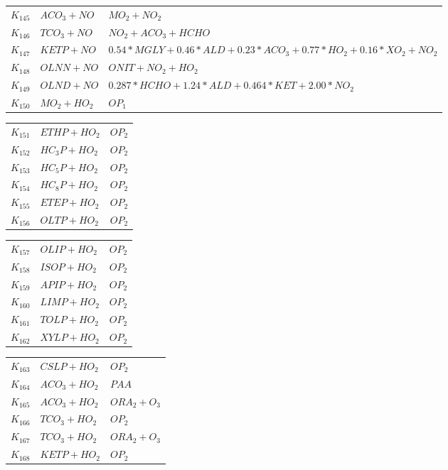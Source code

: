 {\begin{tabular}{l@{\,:\,}p{0.2\chfwidth}@{$\quad\longrightarrow\quad$}p{0.6\chfwidth}}
$K_{145}$ & $ACO_{3}+NO$ & $MO_{2}+NO_{2}$ \\
$K_{146}$ & $TCO_{3}+NO$ & $NO_{2}+ACO_{3}+HCHO$ \\
$K_{147}$ & $KETP+NO$ & $0.54*MGLY+0.46*ALD+0.23*ACO_{3}+0.77*HO_{2}+0.16*XO_{2}+NO_{2}$ \\
$K_{148}$ & $OLNN+NO$ & $ONIT+NO_{2}+HO_{2}$ \\
$K_{149}$ & $OLND+NO$ & $0.287*HCHO+1.24*ALD+0.464*KET+2.00*NO_{2}$ \\
$K_{150}$ & $MO_{2}+HO_{2}$ & $OP_{1}$ \\
\end{tabular}

\begin{tabular}{l@{\,:\,}p{0.2\chfwidth}@{$\quad\longrightarrow\quad$}p{0.6\chfwidth}}
$K_{151}$ & $ETHP+HO_{2}$ & $OP_{2}$ \\
$K_{152}$ & $HC_{3}P+HO_{2}$ & $OP_{2}$ \\
$K_{153}$ & $HC_{5}P+HO_{2}$ & $OP_{2}$ \\
$K_{154}$ & $HC_{8}P+HO_{2}$ & $OP_{2}$ \\
$K_{155}$ & $ETEP+HO_{2}$ & $OP_{2}$ \\
$K_{156}$ & $OLTP+HO_{2}$ & $OP_{2}$ \\
\end{tabular}

\begin{tabular}{l@{\,:\,}p{0.2\chfwidth}@{$\quad\longrightarrow\quad$}p{0.6\chfwidth}}
$K_{157}$ & $OLIP+HO_{2}$ & $OP_{2}$ \\
$K_{158}$ & $ISOP+HO_{2}$ & $OP_{2}$ \\
$K_{159}$ & $APIP+HO_{2}$ & $OP_{2}$ \\
$K_{160}$ & $LIMP+HO_{2}$ & $OP_{2}$ \\
$K_{161}$ & $TOLP+HO_{2}$ & $OP_{2}$ \\
$K_{162}$ & $XYLP+HO_{2}$ & $OP_{2}$ \\
\end{tabular}

\begin{tabular}{l@{\,:\,}p{0.2\chfwidth}@{$\quad\longrightarrow\quad$}p{0.6\chfwidth}}
$K_{163}$ & $CSLP+HO_{2}$ & $OP_{2}$ \\
$K_{164}$ & $ACO_{3}+HO_{2}$ & $PAA$ \\
$K_{165}$ & $ACO_{3}+HO_{2}$ & $ORA_{2}+O_{3}$ \\
$K_{166}$ & $TCO_{3}+HO_{2}$ & $OP_{2}$ \\
$K_{167}$ & $TCO_{3}+HO_{2}$ & $ORA_{2}+O_{3}$ \\
$K_{168}$ & $KETP+HO_{2}$ & $OP_{2}$ \\
\end{tabular}

}
